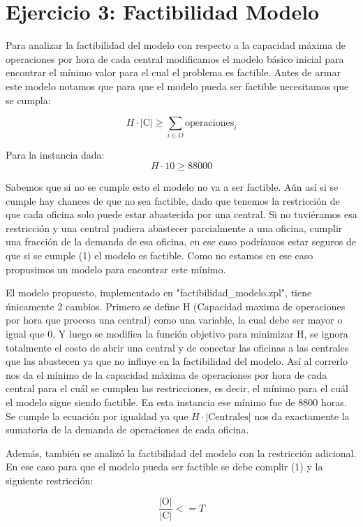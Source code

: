 \documentclass{article}
\begin{document}
\section*{Ejercicio 3: Factibilidad Modelo}

Para analizar la factibilidad del modelo con respecto a la capacidad máxima de operaciones por hora de cada central modificamos el modelo básico inicial para encontrar el mínimo valor para el cual el problema es factible. 
Antes de armar este modelo notamos que para que el modelo pueda ser factible necesitamos que se cumpla:

\[
H \cdot \lvert \text{C} \rvert \geq \sum_{i \in O} \text{operaciones}_i \tag{1} 
\]

Para la instancia dada:
\[
H \cdot 10 \geq 88000
\]

Sabemos que si no se cumple esto el modelo no va a ser factible. Aún así si se cumple hay chances de que no sea factible, dado que tenemos la restricción de que cada oficina solo puede estar abastecida por una central. Si no tuviéramos esa restricción y una central pudiera abastecer parcialmente a una oficina, cumplir una fracción de la demanda de esa oficina, en ese caso podríamos estar seguros de que si se cumple (1) el modelo es factible. Como no estamos en ese caso propusimos un modelo para encontrar este mínimo.

El modelo propuesto, implementado en "factibilidad_modelo.zpl", tiene únicamente 2 cambios. Primero se define H (Capacidad maxima de operaciones por hora que procesa una central) como una variable, la cual debe ser mayor o igual que 0. Y luego se modifica la función objetivo para minimizar H, se ignora totalmente el costo de abrir una central y de conectar las oficinas a las centrales que las abastecen ya que no influye en la factibilidad del modelo. Así al correrlo nos da el mínimo de la capacidad máxima de operaciones por hora de cada central para el cuál se cumplen las restricciones, es decir, el mínimo para el cuál el modelo sigue siendo factible. En esta instancia ese mínimo fue de 8800 horas. Se cumple la ecuación por igualdad ya que \( H \cdot \lvert \text{Centrales} \rvert \) nos da exactamente la sumatoria de la demanda de operaciones de cada oficina.

Además, también se analizó la factibilidad del modelo con la restricción adicional. En ese caso para que el modelo pueda ser factible se debe complir (1) y la siguiente restricción:

\[
\frac{\lvert \text{O} \rvert}{\lvert \text{C} \rvert}  <= T
\]
\end{document}
